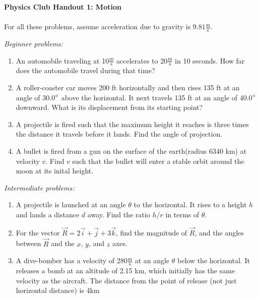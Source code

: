 \documentclass[12pt]{article}
\begin{document}
\textbf{Physics Club Handout 1: Motion}
\\
\\
For all these problems, assume acceleration due to gravity is $9.81\frac{\text{m}}{\text{s}}$.

\emph{Beginner problems:}

\begin{enumerate}
\item
An automobile traveling at 10$\frac{\text{m}}{\text{s}}$ accelerates to 20$\frac{\text{m}}{\text{s}}$ in 10 seconds. How far does the automobile travel during that time?

\item
A roller-coaster car moves 200 ft horizontally and then rises 135 ft at an angle of 30.0$\degree$ above the horizontal. It next travels 135 ft at an angle of 40.0$\degree$ downward. What is its displacement from its starting point?

\item
A projectile is fired such that the maximum height it reaches is three times the distance it travels before it lands. Find the angle of projection.

\item
A bullet is fired from a gun on the surface of the earth(radius 6340 km) at velocity $v$. Find $v$ such that the bullet will enter a stable orbit around the moon at its inital height.
\end{enumerate}

\emph{Intermediate problems:}
\begin{enumerate}
\item
A projectile is launched at an angle $\theta$ to the horizontal. It rises to a height $h$ and lands a distance $d$ away. Find the ratio $h/r$ in terms of $\theta$.

\item
For the vector $\vec{R} = 2\vec{i} + \vec{j} + 3\vec{k}$, find the magnitude of $\vec{R}$, and the angles between $\vec{R}$ and the $x$, $y$, and $z$ axes.

\item
A dive-bomber has a velocity of 280$\frac{\text{m}}{\text{s}}$ at an angle $\theta$ below the horizontal. It releases a bomb at an altitude of 2.15 km, which initially has the same velocity as the aircraft. The distance from the point of release (not just horizontal distance) is 4km
\end{enumerate}
\end{document}
